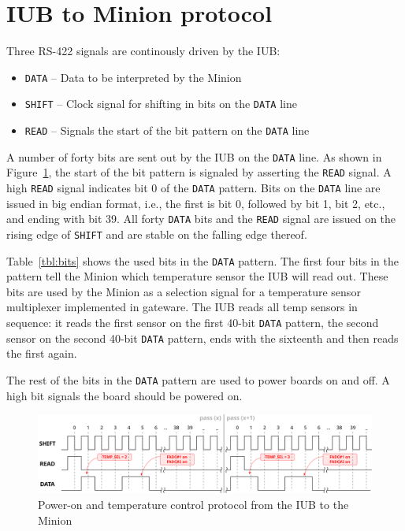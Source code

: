 \documentclass[a4paper,11pt]{article}
\begin{document}
\pagebreak
\section{IUB to Minion protocol}
\label{sec:prot}

Three RS-422 signals are continously driven by the IUB:

\begin{itemize}
  \item \verb=DATA= -- Data to be interpreted by the Minion
  \item \verb=SHIFT= -- Clock signal for shifting in bits on the \verb=DATA= line
  \item \verb=READ= -- Signals the start of the bit pattern on the \verb=DATA= line
\end{itemize}

A number of forty bits are sent out by the IUB on the \verb=DATA= line. As shown in
Figure~\ref{fig:protocol}, the start of the bit pattern is signaled by asserting
the \verb=READ= signal. A high \verb=READ= signal indicates bit 0 of the \verb=DATA=
pattern. Bits on the \verb=DATA= line are issued in big endian format, i.e., the first
is bit 0, followed by bit 1, bit 2, etc., and ending with bit 39. All forty \verb=DATA= 
bits and the \verb=READ= signal are issued on the rising edge of \verb=SHIFT= and are 
stable on the falling edge thereof.

Table~\ref{tbl:bits} shows the used bits in the \verb=DATA= pattern. The first four
bits in the pattern tell the Minion which temperature sensor the IUB will read out.
These bits are used by the Minion as a selection signal for a temperature sensor 
multiplexer implemented in gateware. The IUB reads all temp sensors in sequence: it reads
the first sensor on the first 40-bit \verb=DATA= pattern, the second sensor on the second 
40-bit \verb=DATA= pattern, ends with the sixteenth and then reads the first again.

The rest of the bits in the \verb=DATA= pattern are used to power boards on and off. A 
high bit signals the board should be powered on.

\begin{figure}[h]
  \includegraphics[width=.92\textwidth]{fig/protocol}
  \caption{\label{fig:protocol} Power-on and temperature control protocol from the IUB
    to the Minion}
\end{figure}
\end{document}

